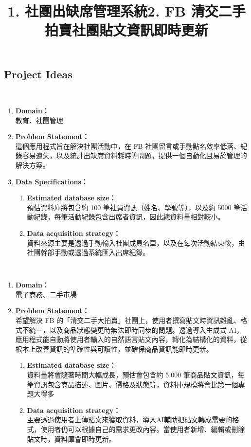\subsection{Project Ideas}
\ \\
\title{\bf{1. 社團出缺席管理系統}}
\begin{enumerate}
    \item {\bf{Domain：}} \\教育、社團管理
    \item {\bf{Problem Statement：}} \\這個應用程式旨在解決社團活動中，在 FB 社團留言或手動點名效率低落、紀錄容易遺失，以及統計出缺席資料耗時等問題，提供一個自動化且易於管理的解決方案。
    \item {\bf{Data Specifications：}}
        \begin{enumerate}
            \item {\bf{Estimated database size：}} \\預估資料庫將包含約 100 筆社員資訊（姓名、學號等），以及約 5000 筆活動紀錄，每筆活動紀錄包含出席者資訊，因此總資料量相對較小。
            \item {\bf{Data acquisition strategy：}} \\資料來源主要是透過手動輸入社團成員名單，以及在每次活動結束後，由社團幹部手動或透過系統匯入出席紀錄。
        \end{enumerate}
\end{enumerate}
\ \\
\title{\bf{2. FB 清交二手拍賣社團貼文資訊即時更新}}
\begin{enumerate}
    \item {\bf{Domain：}} \\電子商務、二手市場
    \item {\bf{Problem Statement：}} \\希望解決 FB 的「清交二手大拍賣」社團上，使用者撰寫貼文時資訊雜亂、格式不統一，以及商品狀態變更時無法即時同步的問題。透過導入生成式 AI，應用程式能自動將使用者輸入的自然語言貼文內容，轉化為結構化的資料，從根本上改善資訊的準確性與可讀性，並確保商品資訊能即時更新。
        \begin{enumerate}
            \item {\bf{Estimated database size：}} \\資料量將會隨著時間大幅成長，預估會包含約 5,000 筆商品貼文資訊，每筆資訊包含商品描述、圖片、價格及狀態等，資料庫規模將會比第一個專題大得多
            \item {\bf{Data acquisition strategy：}} \\主要透過使用者上傳貼文來獲取資料，導入AI輔助把貼文轉成需要的格式，使用者仍可以根據自己的需求更改內容。當使用者新增、編輯或刪除貼文時，資料庫會即時更新。
        \end{enumerate}
\end{enumerate}
